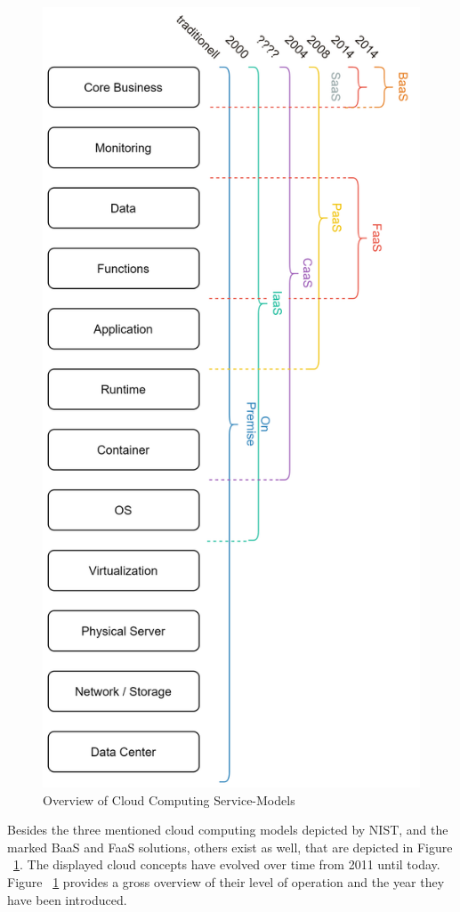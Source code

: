 \documentclass[a4paper,twoside,11pt, pagesize]{scrartcl}
\begin{document}
\begin{spacing}{1.2}
\begin{figure}[H]
\label{fig:cloudComputingConcepts}
\centering
\includegraphics[angle=90,width=1\textwidth]{serviceModels}
\caption{Overview of Cloud Computing Service-Models}
\end{figure}
Besides the three mentioned cloud computing models depicted by NIST, and the marked BaaS and FaaS solutions, others exist as well, that are depicted in Figure ~\ref{fig:cloudComputingConcepts}. The displayed cloud concepts have evolved over time from 2011 until today. Figure ~\ref{fig:cloudComputingConcepts} provides a gross overview of their level of operation and the year they have been introduced. 

\end{spacing}
\end{document}
